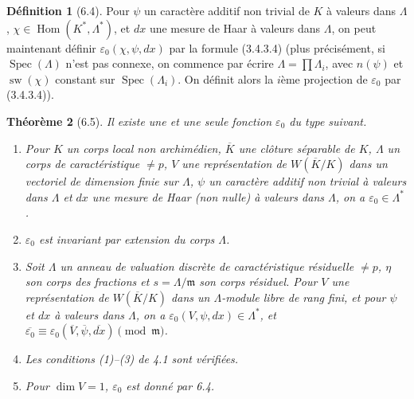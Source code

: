 \documentclass[11pt]{amsart}
\theoremstyle{plain}
\newtheorem{theorem}{Th\'eor\`eme}[section]
\theoremstyle{definition}
\newtheorem{definition}[theorem]{D\'efinition}
\DeclareMathOperator{\Hom}{Hom}
\DeclareMathOperator{\Spec}{Spec}
\DeclareMathOperator{\sw}{sw}
\begin{document}
\begin{definition}[6.4]
Pour $\psi$ un caract\`ere additif non trivial de $K$ \`a valeurs dans $\Lambda$, $\chi \in \Hom(K^*, \Lambda^*)$, et $dx$ une mesure de Haar \`a valeurs dans $\Lambda$, on peut maintenant d\'efinir $\varepsilon_0(\chi,\psi,dx)$ par la formule (3.4.3.4) (plus pr\'ecis\'ement, si $\Spec(\Lambda)$ n'est pas connexe, on commence par \'ecrire $\Lambda = \prod \Lambda_i$, avec $n(\psi)$ et $\sw(\chi)$ constant sur $\Spec(\Lambda_i)$. On d\'efinit alors la $i$\`eme projection de $\varepsilon_0$ par (3.4.3.4)).
\end{definition}

\begin{theorem}[6.5]
Il existe une et une seule fonction $\varepsilon_0$ du type suivant.
\begin{enumerate}
\item[(a)] Pour $K$ un corps local non archim\'edien, $\overline{K}$ une cl\^oture s\'eparable de $K$, $\Lambda$ un corps de caract\'eristique $\not= p$, $V$ une repr\'esentation de $W(\overline{K}/K)$ dans un vectoriel de dimension finie sur $\Lambda$, $\psi$ un caract\`ere additif non trivial \`a valeurs dans $\Lambda$ et $dx$ une mesure de Haar (non nulle) \`a valeurs dans $\Lambda$, on a $\varepsilon_0 \in \Lambda^*$.
\item[(b)] $\varepsilon_0$ est invariant par extension du corps $\Lambda$.
\item[(c)] Soit $\Lambda$ un anneau de valuation discr\`ete de caract\'eristique r\'esiduelle $\not= p$, $\eta$ son corps des fractions et $s = \Lambda/\mathfrak{m}$ son corps r\'esiduel. Pour $V$ une repr\'esentation de $W(\overline{K}/K)$ dans un $\Lambda$-module libre de rang fini, et pour $\psi$ et $dx$ \`a valeurs dans $\Lambda$, on a $\varepsilon_0(V,\psi,dx) \in \Lambda^*$, et $\overline{\varepsilon_0} \equiv \varepsilon_0(\overline{V},\overline{\psi},\overline{dx}) \pmod{\mathfrak{m}}$.
\item[(d)] Les conditions (1)--(3) de 4.1 sont v\'erifi\'ees.
\item[(e)] Pour $\dim V = 1$, $\varepsilon_0$ est donn\'e par 6.4.
\end{enumerate}
\end{theorem}
\end{document}
